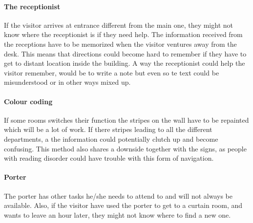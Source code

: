 \paragraph{The receptionist}
If the visitor arrives at entrance different from the main one, they might not know where the receptionist is if they need help. The information received from the receptions have to be memorized when the visitor ventures away from the desk. This means that directions could become hard to remember if they have to get to distant location inside the building. A way the receptionist could help the visitor remember, would be to write a note but even so te text could be misunderstood or in other ways mixed up.

\paragraph{Colour coding}
If some rooms switches their function the stripes on the wall have to be repainted which will be a lot of work. If there stripes leading to all the different departments, a the information could potentially clutch up and become confusing. This method also shares a downside together with the signs, as people with reading disorder could have trouble with this form of navigation.

\paragraph{Porter}
The porter has other tasks he/she needs to attend to and will not always be available. Also, if the visitor have used the porter to get to a curtain room, and wants to leave an hour later, they might not know where to find a new one. 

